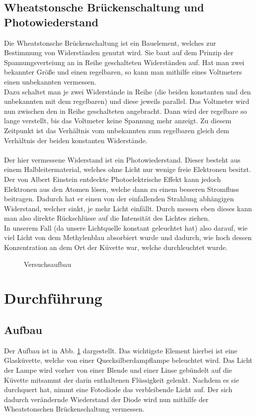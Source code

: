 \documentclass[12pt,a4paper,titlepage,headinclude,bibtotoc]{scrartcl}
\begin{document}
\subsection{Wheatstonsche Brückenschaltung und Photowiederstand}
Die Wheatstonsche Brückenschaltung ist ein Bauelement, welches zur Bestimmung von Widerständen genutzt wird.
Sie baut auf dem Prinzip der Spannungsverteiung an in Reihe geschalteten Widerständen auf.
Hat man zwei bekannter Größe und einen regelbaren, so kann man mithilfe eines Voltmeters einen unbekannten vermessen.\\
Dazu schaltet man je zwei Widerstände in Reihe (die beiden konstanten und den unbekannten mit dem regelbaren) und diese jeweils parallel.
Das Voltmeter wird nun zwischen den in Reihe geschalteten angebracht.
Dann wird der regelbare so lange verstellt, bis das Voltmeter keine Spannung mehr anzeigt.
Zu diesem Zeitpunkt ist das Verhältnis vom unbekannten zum regelbaren gleich dem Verhältnis der beiden konstanten Widerstände.\\\\
Der hier vermessene Widerstand ist ein Photowiederstand. 
Dieser besteht aus einem Halbleitermaterial, welches ohne Licht nur wenige freie Elektronen besitzt.
Der von Albert Einstein entdeckte Photoelektrische Effekt kann jedoch Elektronen aus den Atomen lösen, welche dann zu einem besseren Stromfluss beitragen.
Dadurch hat er einen von der einfallenden Strahlung abhängigen Widerstand, welcher sinkt, je mehr Licht einfällt.
Durch messen eben dieses kann man also direkte Rückschlüsse auf die Intensität des Lichtes ziehen.\\
In unserem Fall (da unsere Lichtquelle konstant geleuchtet hat) also darauf, wie viel Licht von dem Methylenblau absorbiert wurde und dadurch, wie hoch dessen Konzentration an dem Ort der Küvette war, welche durchleuchtet wurde.
\begin{figure}[!b]
 \centering
 \def\svgwidth{0.8\columnwidth}
 
 \caption{Versuchsaufbau\label{fig:aufbau}}
\end{figure}

\section{Durchführung}
\label{sec:durchfuehrung}
\subsection{Aufbau}
Der Aufbau ist in Abb. \ref{fig:aufbau} dargestellt.
Das wichtigste Element hierbei ist eine Glasküvette, welche von einer Quecksilberdampflampe beleuchtet wird.
Das Licht der Lampe wird vorher von einer Blende und einer Linse gebündelt auf die Küvette mitsammt der darin enthaltenen Flüssigkeit gelenkt.
Nachdem es sie durchquert hat, nimmt eine Fotodiode das verbleibende Licht auf.
Der sich dadurch verändernde Wiederstand der Diode wird nun mithilfe der Wheatstonschen Brückenschaltung vermessen.
\end{document}
